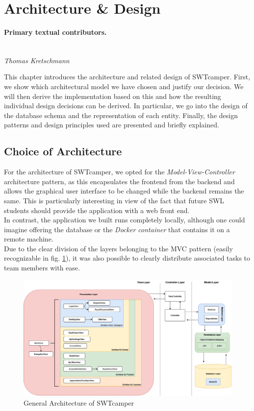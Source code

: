 \section{Architecture \& Design}
\label{sec:architecture_design}

\paragraph{Primary textual contributors.}
\mbox{}\\\emph{Thomas Kretschmann}

This chapter introduces the architecture and related design of SWTcamper. First, we show which architectural model we have chosen and justify our decision. We will then derive the implementation based on this and how the resulting individual design decisions can be derived. In particular, we go into the design of the database schema and the representation of each entity. Finally, the design patterns and design principles used are presented and briefly explained.

\subsection{Choice of Architecture}
For the architecture of SWTcamper, we opted for the \textit{Model-View-Controller} architecture pattern, as this encapsulates the frontend from the backend and allows the graphical user interface to be changed while the backend remains the same. This is particularly interesting in view of the fact that future SWL students should provide the application with a web front end. \\
In contrast, the application we built runs completely locally, although one could imagine offering the database or the \textit{Docker container} that contains it on a remote machine. \\
Due to the clear division of the layers belonging to the MVC pattern (easily recognizable in fig. \ref{fig:architecture}), it was also possible to clearly distribute associated tasks to team members with ease.

\begin{figure}[h]
	\centering
	\includegraphics[width=15cm]{resources/images/architecture.drawio.png}
	\caption{General Architecture of SWTcamper}
	\label{fig:architecture}
\end{figure}

